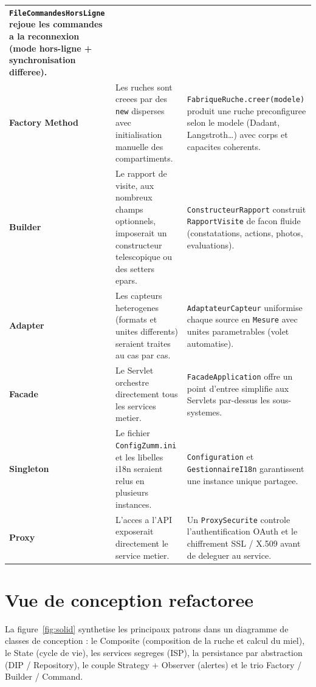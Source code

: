 \begin{xltabular}{\textwidth}{>{\bfseries}p{2.7cm} p{5.9cm} X}
\texttt{FileCommandesHorsLigne} rejoue les commandes a la reconnexion
(mode hors-ligne + synchronisation differee). \\
Factory Method  &
Les ruches sont creees par des \texttt{new} disperses avec initialisation
manuelle des compartiments. &
\texttt{FabriqueRuche.creer(modele)} produit une ruche preconfiguree selon le
modele (Dadant, Langstroth\ldots) avec corps et capacites coherents. \\
Builder  &
Le rapport de visite, aux nombreux champs optionnels, imposerait un constructeur
telescopique ou des setters epars. &
\texttt{ConstructeurRapport} construit \texttt{RapportVisite} de facon fluide
(constatations, actions, photos, evaluations). \\
Adapter  &
Les capteurs heterogenes (formats et unites differents) seraient traites au cas
par cas. &
\texttt{AdaptateurCapteur} uniformise chaque source en \texttt{Mesure} avec
unites parametrables (volet automatise). \\
Facade  &
Le Servlet orchestre directement tous les services metier. &
\texttt{FacadeApplication} offre un point d'entree simplifie aux Servlets
par-dessus les sous-systemes. \\
Singleton  &
Le fichier \texttt{ConfigZumm.ini} et les libelles i18n seraient relus en
plusieurs instances. &
\texttt{Configuration} et \texttt{GestionnaireI18n} garantissent une instance
unique partagee. \\
Proxy  &
L'acces a l'API exposerait directement le service metier. &
Un \texttt{ProxySecurite} controle l'authentification OAuth et le chiffrement
SSL / X.509 avant de deleguer au service. \\
\bottomrule
\end{xltabular}

\section{Vue de conception refactoree}
La figure~\ref{fig:solid} synthetise les principaux patrons dans un diagramme
de classes de conception : le Composite (composition de la ruche et calcul du
miel), le State (cycle de vie), les services segreges (ISP), la persistance par
abstraction (DIP / Repository), le couple Strategy + Observer (alertes) et le
trio Factory / Builder / Command.

